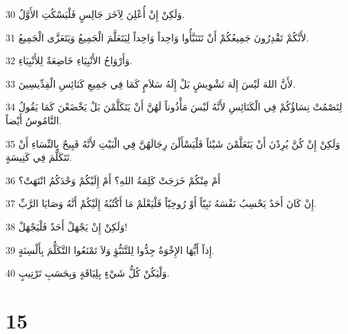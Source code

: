 \par 30 وَلَكِنْ إِنْ أُعْلِنَ لِآخَرَ جَالِسٍ فَلْيَسْكُتِ الأَوَّلُ.
\par 31 لأَنَّكُمْ تَقْدِرُونَ جَمِيعُكُمْ أَنْ تَتَنَبَّأُوا وَاحِداً وَاحِداً لِيَتَعَلَّمَ الْجَمِيعُ وَيَتَعَزَّى الْجَمِيعُ.
\par 32 وَأَرْوَاحُ الأَنْبِيَاءِ خَاضِعَةٌ لِلأَنْبِيَاءِ.
\par 33 لأَنَّ اللهَ لَيْسَ إِلَهَ تَشْوِيشٍ بَلْ إِلَهُ سَلاَمٍ كَمَا فِي جَمِيعِ كَنَائِسِ الْقِدِّيسِينَ.
\par 34 لِتَصْمُتْ نِسَاؤُكُمْ فِي الْكَنَائِسِ لأَنَّهُ لَيْسَ مَأْذُوناً لَهُنَّ أَنْ يَتَكَلَّمْنَ بَلْ يَخْضَعْنَ كَمَا يَقُولُ النَّامُوسُ أَيْضاً.
\par 35 وَلَكِنْ إِنْ كُنَّ يُرِدْنَ أَنْ يَتَعَلَّمْنَ شَيْئاً فَلْيَسْأَلْنَ رِجَالَهُنَّ فِي الْبَيْتِ لأَنَّهُ قَبِيحٌ بِالنِّسَاءِ أَنْ تَتَكَلَّمَ فِي كَنِيسَةٍ.
\par 36 أَمْ مِنْكُمْ خَرَجَتْ كَلِمَةُ اللهِ؟ أَمْ إِلَيْكُمْ وَحْدَكُمُ انْتَهَتْ؟
\par 37 إِنْ كَانَ أَحَدٌ يَحْسِبُ نَفْسَهُ نَبِيّاً أَوْ رُوحِيّاً فَلْيَعْلَمْ مَا أَكْتُبُهُ إِلَيْكُمْ أَنَّهُ وَصَايَا الرَّبِّ.
\par 38 وَلَكِنْ إِنْ يَجْهَلْ أَحَدٌ فَلْيَجْهَلْ!
\par 39 إِذاً أَيُّهَا الإِخْوَةُ جِدُّوا لِلتَّنَبُّؤِ وَلاَ تَمْنَعُوا التَّكَلُّمَ بِأَلْسِنَةٍ.
\par 40 وَلْيَكُنْ كُلُّ شَيْءٍ بِلِيَاقَةٍ وَبِحَسَبِ تَرْتِيبٍ.

\chapter{15}


